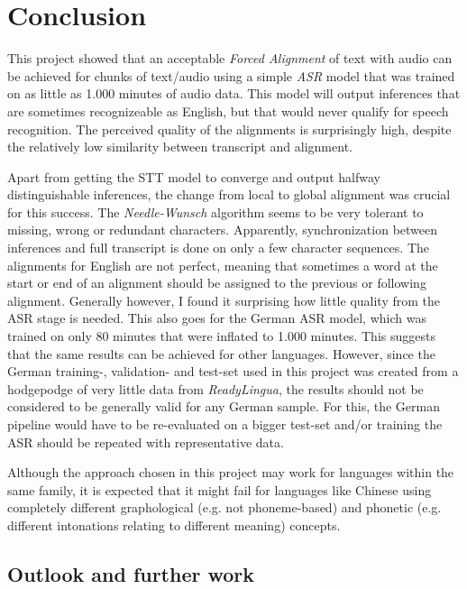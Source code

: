 \section{Conclusion}\label{conclusion}

This project showed that an acceptable \textit{Forced Alignment} of text with audio can be achieved for chunks of text/audio using a simple \textit{ASR} model that was trained on as little as 1.000 minutes of audio data. This model will output inferences that are sometimes recognizeable as English, but that would never qualify for speech recognition. The perceived quality of the alignments is surprisingly high, despite the relatively low similarity between transcript and alignment. 

Apart from getting the \ac{STT} model to converge and output halfway distinguishable inferences, the change from local to global alignment was crucial for this success. The \textit{Needle-Wunsch} algorithm seems to be very tolerant to missing, wrong or redundant characters. Apparently, synchronization between inferences and full transcript is done on only a few character sequences. The alignments for English are not perfect, meaning that sometimes a word at the start or end of an alignment should be assigned to the previous or following alignment. Generally however, I found it surprising how little quality from the \ac{ASR} stage is needed. This also goes for the German \ac{ASR} model, which was trained on only 80 minutes that were inflated to 1.000 minutes. This suggests that the same results can be achieved for other languages. However, since the German training-, validation- and test-set used in this project was created from a hodgepodge of very little data from \textit{ReadyLingua}, the results should not be considered to be generally valid for any German sample. For this, the German pipeline would have to be re-evaluated on a bigger test-set and/or training the \ac{ASR} should be repeated with representative data.

Although the approach chosen in this project may work for languages within the same family, it is expected that it might fail for languages like Chinese using completely different graphological (e.g. not phoneme-based) and phonetic (e.g. different intonations relating to different meaning) concepts.

\subsection{Outlook and further work}

